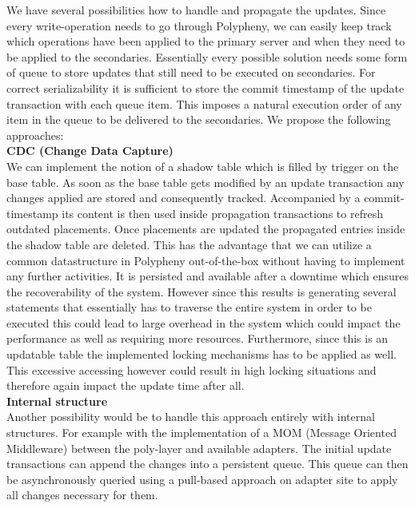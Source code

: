 \todoMissing{}

We have several possibilities how to handle and propagate the updates.
Since every write-operation needs to go through Polypheny, we can easily keep track which operations have been applied to the primary server and when 
they need to be applied to the secondaries. Essentially every possible solution needs some form of queue to store updates that still need to be executed 
on secondaries. For correct serializability it is sufficient to store the commit timestamp of the update transaction with each queue item. This imposes a natural
execution order of any item in the queue to be delivered to the secondaries.
We propose the following approaches: \\

\textbf{CDC (Change Data Capture)}\\
We can implement the notion of a shadow table which is filled by trigger on the base table.
As soon as the base table gets modified by an update transaction any changes applied are stored and consequently tracked.
Accompanied by a commit-timestamp its content is then used inside propagation transactions to refresh outdated placements.
Once placements are updated the propagated entries inside the shadow table are deleted. 
This has the advantage that we can utilize a common datastructure in Polypheny out-of-the-box without having to implement any further activities.
It is persisted and available after a downtime which ensures the recoverability of the system.
However since this results is generating several statements that essentially has to traverse the entire system in order to be executed this could lead to 
large overhead in the system which could impact the performance as well as requiring more resources.
Furthermore, since this is an updatable table the implemented locking mechanisms has to be applied as well. This excessive accessing however could result in high 
locking situations and therefore again impact the update time after all.\\

\textbf{Internal structure}\\
Another possibility would be to handle this approach entirely with internal structures.
For example with the implementation of a MOM (Message Oriented Middleware) between the poly-layer and available adapters. The initial update transactions can append 
the changes into a persistent queue. This queue can then be asynchronously queried using a pull-based approach on adapter site to apply all changes necessary for them. \\

